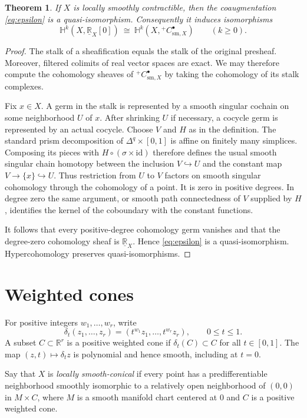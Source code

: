 \documentclass[11pt]{article}
\newtheorem{theorem}{Theorem}
\newcommand{\R}{\mathbb R}
\newcommand{\cC}{C}
\newcommand{\HH}{\mathbb H}
\begin{document}
\begin{theorem}\label{thm:criterion}
If $X$ is locally smoothly contractible, then the coaugmentation
\eqref{eq:epsilon} is a quasi-isomorphism.  Consequently it induces
isomorphisms
$$
 \HH^k(X,\underline{\R}_X[0])\ \cong\
 \HH^k(X,{}^{+}\cC^\bullet_{\mathrm{sm},X})
 \qquad(k\geq0).
$$
\end{theorem}

\begin{proof}
The stalk of a sheafification equals the stalk of the original presheaf.
Moreover, filtered colimits of real vector spaces are exact.  We may therefore
compute the cohomology sheaves of
$ {}^{+}\cC^\bullet_{\mathrm{sm},X}$ by taking the cohomology of its stalk
complexes.

Fix $x\in X$.  A germ in the stalk is represented by a smooth singular
cochain on some neighborhood $U$ of $x$.  After shrinking $U$ if necessary,
a cocycle germ is represented by an actual cocycle.  Choose $V$ and $H$ as in
the definition.  The standard prism decomposition of
$\Delta^q\times[0,1]$ is affine on finitely many simplices.  Composing its
pieces with $H\circ(\sigma\times\mathrm{id})$ therefore defines the usual
smooth singular chain homotopy between the inclusion $V\hookrightarrow U$
and the constant map $V\to\{x\}\hookrightarrow U$.  Thus restriction from
$U$ to $V$ factors on smooth singular cohomology through the cohomology of a
point.  It is zero in positive degrees.  In degree zero the same argument,
or smooth path connectedness of $V$ supplied by $H$, identifies the kernel of
the coboundary with the constant functions.

It follows that every positive-degree cohomology germ vanishes and that the
degree-zero cohomology sheaf is $\underline{\R}_X$.  Hence \eqref{eq:epsilon}
is a quasi-isomorphism.  Hypercohomology preserves quasi-isomorphisms.
\end{proof}

\section{Weighted cones}

For positive integers $w_1,\dots,w_r$, write
$$
 \delta_t(z_1,\dots,z_r)
   =(t^{w_1}z_1,\dots,t^{w_r}z_r),\qquad 0\leq t\leq1.
$$
A subset $C\subset\R^r$ is a positive weighted cone if
$\delta_t(C)\subset C$ for all $t\in[0,1]$.  The map $(z,t)\mapsto\delta_tz$
is polynomial and hence smooth, including at $t=0$.

Say that $X$ is \emph{locally smooth-conical} if every point has a
predifferentiable neighborhood smoothly isomorphic to a relatively open
neighborhood of $(0,0)$ in $M\times C$, where $M$ is a smooth manifold chart
centered at $0$ and $C$ is a positive weighted cone.
\end{document}
